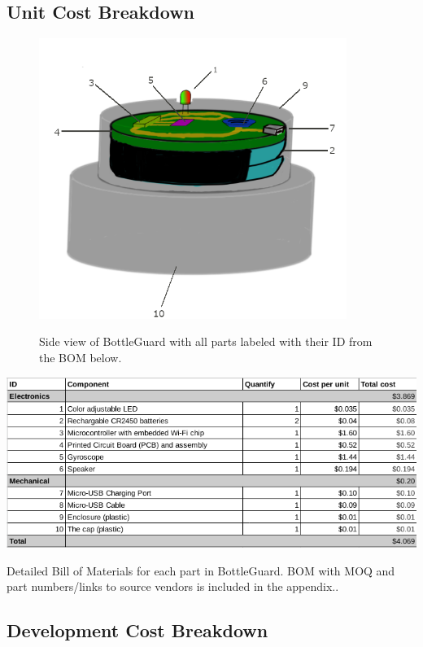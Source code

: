 \documentclass[12pt]{article}
\begin{document}
	\subsection*{Unit Cost Breakdown}
		\begin{figure}[H]
		\centering
		\includegraphics[width=10cm ]{DesignLabeled.png}
		\label{fig:design}
		\caption{Side view of BottleGuard with all parts labeled with their ID from the BOM below.}
	\end{figure}
\begin{table}[H]
	\includegraphics[width=\textwidth]{bom_small.png}
	\label{fig:bom}
	\caption{Detailed Bill of Materials for each part in BottleGuard. BOM with MOQ and part numbers/links to source vendors is included in the appendix..}
\end{table}
	\subsection*{Development Cost Breakdown}
\end{document}
